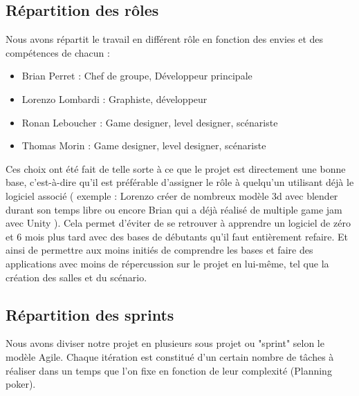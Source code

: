 \documentclass[a4paper,11pt]{article}
\begin{document}
\subsection{Répartition des rôles}

Nous avons répartit le travail en différent rôle en fonction des envies 
et des compétences de chacun :\newline

\begin{itemize}
    \item Brian Perret : Chef de groupe, Développeur principale 
    \item Lorenzo Lombardi : Graphiste, développeur
    \item Ronan Leboucher : Game designer, level designer, scénariste
    \item Thomas Morin : Game designer, level designer, scénariste
\end{itemize}

\break

Ces choix ont été fait de telle sorte à ce que le projet est directement une bonne base, 
c’est-à-dire qu’il est préférable d’assigner le rôle à quelqu'un utilisant déjà le logiciel 
associé ( exemple : Lorenzo créer de nombreux modèle 3d avec blender durant son temps libre ou encore
 Brian qui a déjà réalisé de multiple game jam avec Unity ). Cela permet d'éviter de se retrouver à 
 apprendre un logiciel de zéro et 6 mois plus tard avec des bases de débutants qu’il faut entièrement refaire.
Et ainsi de permettre aux moins initiés de comprendre les bases et faire des applications avec 
moins de répercussion sur le projet en lui-même, tel que la création des salles et du scénario.

\subsection{Répartition des sprints}

Nous avons diviser notre projet en plusieurs sous projet ou "sprint" selon le modèle Agile.
Chaque itération est constitué d'un certain nombre de tâches à réaliser dans un temps que l'on fixe 
en fonction de leur complexité (Planning poker).\newline
\end{document}
